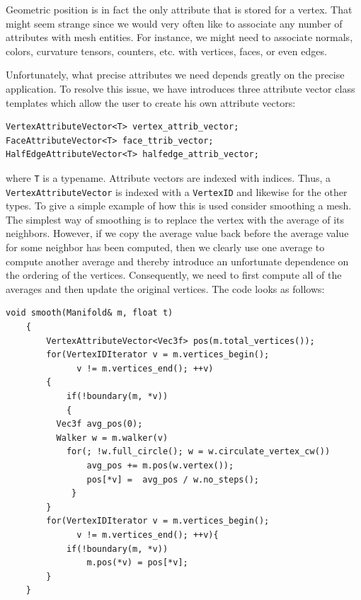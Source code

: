 \documentclass[a4paper]{article}
\begin{document}
Geometric position is in fact the only attribute that is stored for a vertex. That might seem strange since we would very often like to associate any number of attributes with mesh entities. For instance, we might need to associate normals, colors, curvature tensors, counters, etc. with vertices, faces, or even edges.

Unfortunately, what precise attributes we need depends greatly on the precise application. To resolve this issue, we have introduces three attribute vector class templates which allow the user to create his own attribute vectors:
\begin{verbatim}
VertexAttributeVector<T> vertex_attrib_vector; 
FaceAttributeVector<T> face_ttrib_vector;
HalfEdgeAttributeVector<T> halfedge_attrib_vector;
\end{verbatim}
where \texttt{T} is a typename. Attribute vectors are indexed with indices. Thus, a
\texttt{VertexAttributeVector} is indexed with a \texttt{VertexID} and likewise for the other types. To give a simple example of how this is used consider smoothing a mesh. The simplest way of smoothing is to replace the vertex with the average of its neighbors. However, if we copy the average value back before the average value for some neighbor has been computed, then we clearly use one average to compute another average and thereby introduce an unfortunate dependence on the ordering of the vertices. Consequently, we need to first compute all of the averages and then update the original vertices. The code looks as follows:
\begin{verbatim}
void smooth(Manifold& m, float t)
    {
        VertexAttributeVector<Vec3f> pos(m.total_vertices());
        for(VertexIDIterator v = m.vertices_begin(); 
              v != m.vertices_end(); ++v)
        {
            if(!boundary(m, *v))
            {
          Vec3f avg_pos(0);
          Walker w = m.walker(v)
            for(; !w.full_circle(); w = w.circulate_vertex_cw())
                avg_pos += m.pos(w.vertex());
                pos[*v] =  avg_pos / w.no_steps();
             }
        }
        for(VertexIDIterator v = m.vertices_begin(); 
              v != m.vertices_end(); ++v){
            if(!boundary(m, *v))
                m.pos(*v) = pos[*v];
        }
    }
\end{verbatim}
\end{document}
